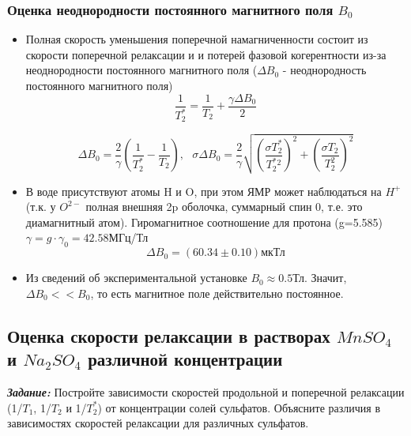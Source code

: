 \documentclass{article}
\begin{document}
\subsubsection{Оценка неоднородности постоянного магнитного поля $B_0$}
\begin{itemize}

\item Полная скорость уменьшения поперечной намагниченности состоит из скорости поперечной релаксации и и потерей фазовой когерентности из-за неоднородности 
постоянного магнитного поля ($\Delta B_0$ - неоднородность постоянного магнитного поля)
\begin{equation*}
    \frac{1}{T_2^*} = \frac{1}{T_2}+\frac{\gamma \Delta B_0}{2}
\end{equation*}

\begin{equation*}
    \Delta B_0 = \frac{2}{\gamma}\left( \frac{1}{T_2^*}-\frac{1}{T_2} \right), ~~~ \sigma \Delta B_0 = \frac{2}{\gamma}\sqrt{\left(\frac{\sigma T_2^*}{T_2^*^2}\right)^2+\left(\frac{\sigma T_2}{T_2^2}\right)^2}
\end{equation*}
\item В воде присутствуют атомы H и O, при этом ЯМР может наблюдаться на $H^+$ (т.к. у $O^{2-}$ полная внешняя 2p оболочка, суммарный спин 0, т.е. это диамагнитный атом). Гиромагнитное соотношение для протона (g=5.585) $\gamma = g\cdot \gamma_0 =42.58 $МГц/Тл
\begin{equation*}
    \Delta B_0 = (60.34 \pm 0.10)\text{мкТл}
\end{equation*}
\item Из сведений об экспериментальной установке $B_0\approx 0.5$Тл. Значит, $\Delta B_0 << B_0$, то есть магнитное поле действительно постоянное.

\end{itemize}



\subsection{Оценка скорости релаксации в растворах $MnSO_4$ и $Na_2SO_4$ различной концентрации}


\textbf{\textit{Задание:}} Постройте зависимости скоростей продольной и поперечной релаксации (1/$T_1$, 1/$T_2$ и 1/$T_2^*$) от концентрации солей сульфатов. Объясните различия в зависимостях скоростей релаксации для различных сульфатов.
\end{document}
